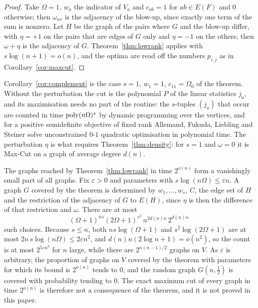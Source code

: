 \begin{proof}
Take $\Omega=1$, $w_a$ the indicator of $V_a$ and $c_{ab}=1$ for $ab\in E(F)$ and $0$
otherwise; then $\omega_{uv}$ is the adjacency of the blow-up, since exactly one
term of the sum is nonzero. Let $H$ be the graph of the pairs where $G$ and the
blow-up differ, with $\eta=+1$ on the pairs that are edges of $G$ only and $\eta=-1$ on
the others; then $\omega+\eta$ is the adjacency of $G$. Theorem~\ref{thm:lowrank} applies
with $s\log(n+1)=o(n)$, and the optima are read off the numbers $p_{i,j}$ as in
Corollary~\ref{cor:maxcut}.
\end{proof}

Corollary~\ref{cor:complement} is the case $s=1$, $w_1=1$, $c_{11}=\Omega_0$ of the
theorem. Without the perturbation the cut is the polynomial $P$ of the linear statistics
$j_a$, and its maximisation needs no part of the routine: the $s$-tuples $(j_a)$ that occur
are counted in time $\operatorname{poly}(n\Omega)^s$ by dynamic programming over the vertices, and
for a positive semidefinite objective of fixed rank Allemand, Fukuda, Liebling and
Steiner \cite{AFLS01} solve unconstrained $0$-$1$ quadratic optimisation in polynomial
time. The perturbation $\eta$ is what requires Theorem~\ref{thm:density}: for $s=1$ and
$\omega=0$ it is Max-Cut on a graph of average degree $d(n)$.

\begin{remark}\label{rem:lowrankcount}
The graphs reached by Theorem~\ref{thm:lowrank} in time $2^{o(n)}$ form a vanishingly
small part of all graphs. Fix $\varepsilon>0$ and parameters with
$s\log(n\Omega)\le\varepsilon n$. A graph $G$ covered by the theorem is determined by
$w_1,\dots,w_s$, $C$, the edge set of $H$ and the restriction of the adjacency of $G$ to
$E(H)$, since $\eta$ is then the difference of that restriction and $\omega$. There
are at most
\[
  (\Omega+1)^{ns}(2\Omega+1)^{s^2}\,n^{2d(n)n}\,2^{d(n)n}
\]
such choices. Because $s\le n$, both $ns\log(\Omega+1)$ and $s^2\log(2\Omega+1)$ are at
most $2n\,s\log(n\Omega)\le2\varepsilon n^2$, and $d(n)n(2\log n+1)=o(n^2)$, so the count
is at most $2^{5\varepsilon n^2}$ for $n$ large, while there are $2^{n(n-1)/2}$ graphs on
$V$. As $\varepsilon$ is arbitrary, the proportion of graphs on $V$ covered by the
theorem with parameters for which its bound is $2^{o(n)}$ tends to $0$, and the random
graph $G(n,\frac12)$ is covered with probability tending to $0$. The exact maximum cut
of every graph in time $2^{o(n)}$ is therefore not a consequence of the theorem, and it
is not proved in this paper.
\end{remark}


